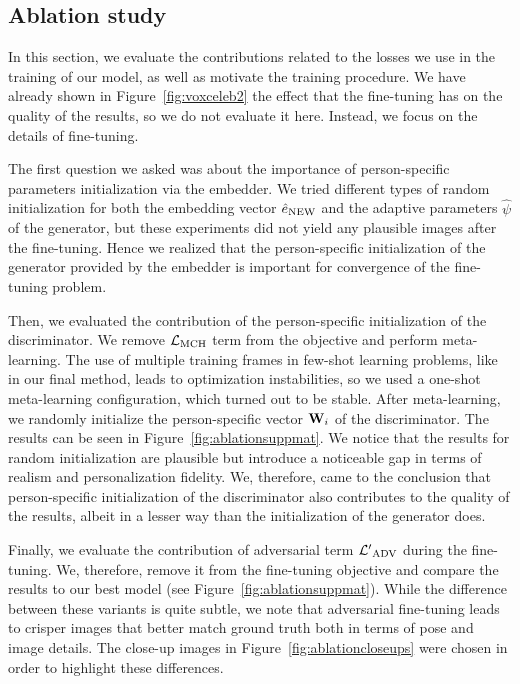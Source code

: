 \documentclass[10pt,twocolumn,letterpaper]{article}
\newcommand{\fig}[1]{Figure~\ref{fig:#1}}
\newcommand{\e}{e}
\begin{document}
\subsection{Ablation study}

In this section, we evaluate the contributions related to the losses we use in the training of our model, as well as motivate the training procedure. We have already shown in \fig{voxceleb2} the effect that the fine-tuning has on the quality of the results, so we do not evaluate it here. Instead, we focus on the details of fine-tuning. 

The first question we asked was about the importance of person-specific parameters initialization via the embedder. We tried different types of random initialization for both the embedding vector $\hat\e\new$ and the adaptive parameters $\hat\psi$ of the generator, but these experiments did not yield any plausible images after the fine-tuning. Hence we realized that the person-specific initialization of the generator provided by the embedder is important for convergence of the fine-tuning problem.

Then, we evaluated the contribution of the person-specific initialization of the discriminator. We remove $\mathcal{L}_\text{MCH}$ term from the objective and perform meta-learning. The use of multiple training frames in few-shot learning problems, like in our final method, leads to optimization instabilities, so we used a one-shot meta-learning configuration, which turned out to be stable. After meta-learning, we randomly initialize the person-specific vector $\mathbf{W}_i$ of the discriminator. The results can be seen in \fig{ablationsuppmat}. We notice that the results for random initialization are plausible but introduce a noticeable gap in terms of realism and personalization fidelity. We, therefore, came to the conclusion that person-specific initialization of the discriminator also contributes to the quality of the results, albeit in a lesser way than the initialization of the generator does.

Finally, we evaluate the contribution of adversarial term $\mathcal{L'}_\text{ADV}$ during the fine-tuning. We, therefore, remove it from the fine-tuning objective and compare the results to our best model (see \fig{ablationsuppmat}). While the difference between these variants is quite subtle, we note that adversarial fine-tuning leads to crisper images that better match ground truth both in terms of pose and image details. The close-up images in \fig{ablationcloseups} were chosen in order to highlight these differences.
\end{document}
